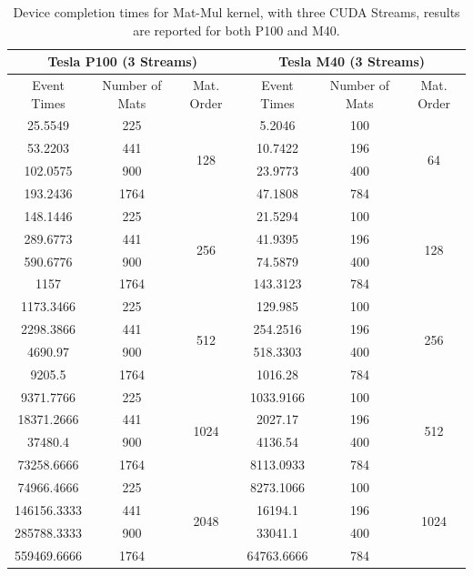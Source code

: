 \begin{table}	
	\centering
	\begin{tabular}{ | c c c  || c c c | } 
		\hline
		\multicolumn{3}{c}{\textbf{Tesla P100 (3 Streams)}} & \multicolumn{3}{c}{\textbf{Tesla M40 (3 Streams)}}\\ [0.5ex]
		\hline
		Event Times  & Number of Mats & Mat. Order & Event Times  & Number of Mats & Mat. Order  \\
		\hline\hline

		25.5549& 225&	\multirow{4}{*}{128}&	5.2046&	100&	\multirow{4}{*}{64}\\
		53.2203&	441&	&	10.7422&	196&	\\
		102.0575&	900&	&	23.9773&	400&	\\
		193.2436&	1764&	&	47.1808&	784&	\\
		\hline
		148.1446&	225&	\multirow{4}{*}{256}&	21.5294&	100&	\multirow{4}{*}{128}\\
		289.6773&	441&	&	41.9395&	196&	\\
		590.6776&	900&	&	74.5879&	400&	\\
		1157&	1764&	&	143.3123&	784&	\\
		\hline
		1173.3466&	225&	\multirow{4}{*}{512}&	129.985&	100&	\multirow{4}{*}{256}\\
		2298.3866&	441&	&	254.2516&	196&	\\
		4690.97&	900&	&	518.3303&	400&	\\
		9205.5&	1764&	&	1016.28&	784&	\\
		\hline
		9371.7766&	225&	\multirow{4}{*}{1024}&	1033.9166&	100&	\multirow{4}{*}{512}\\
		18371.2666&	441&	&	2027.17&	196&	\\
		37480.4&	900&	&	4136.54&	400&	\\
		73258.6666&	1764&	&	8113.0933&	784&	\\
		\hline
		74966.4666&	225&	\multirow{4}{*}{2048}&	8273.1066&	100&	\multirow{4}{*}{1024}\\
		146156.3333&	441&	&	16194.1&	196&	\\
		285788.3333&	900&	&	33041.1&	400&	\\
		559469.6666&	1764&	&	64763.6666&	784&	\\
		\hline
	\end{tabular}
	\caption{Device completion times for Mat-Mul kernel, with three CUDA Streams, results are reported for both P100 and M40.}	
	\label{tab:matvgsThree}		
\end{table}


